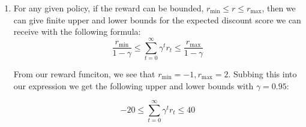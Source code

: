 \documentclass[11pt]{article}
\begin{document}
\begin{enumerate}[label=\alph*)]
    \[
        \vec{U^{\pi}} = (I - \gamma T^{\pi})^{-1}\vec{R^{\pi}}
    \]

    Where $I$ is the $s\times s$ identity matrix, $T^{\pi}$ is the transition probabilities using the given policy at a state $s$. Solving for
    $U^{\pi}(s)$, letting $p = 0.5$ for a fair dice:
    \[
        \vec{U^{\pi}} = \Big(
            \begin{bmatrix}
                1 & 0 & 0 \\
                0 & 1 & 0 \\
                0 & 0 & 1
            \end{bmatrix} - 0.95
            \begin{bmatrix}
                0 & 0.5 & 0.5 \\
                1 & 0 & 0 \\
                1 & 0 & 0
            \end{bmatrix}\Big)^{-1}
            \begin{bmatrix}
                0 \\ 2 \\ -1
            \end{bmatrix}         
    \] 

    \[
        = \begin{bmatrix}
        1 & -0.475 & -0.475 \\
        -0.95 & 1 & 0 \\
        -0.95 & 0 & 1
        \end{bmatrix} ^ {-1}    
        \begin{bmatrix}
            0 \\ 2 \\ -1
        \end{bmatrix} 
    \]

    \[  
    \boxed{ \vec{U^{\pi}} =  
    \begin{bmatrix}
        4.8718 \\ 6.6282 \\ 3.6282
    \end{bmatrix}  }
    \]

    \item
        For any given policy, if the reward can be bounded, $r_{\min} \leq r \leq r_{\max}$, then we can give finite upper and lower bounds 
        for the expected discount score we can receive with the following formula:
        \[
        \frac{r_{\min}}{1-\gamma} \leq \sum^\infty_{t=0} \gamma^t r_t \leq \frac{r_{\max}}{1-\gamma}
        \]

        From our reward funciton, we see that $r_{\min} = -1, r_{\max} = 2$. Subbing this into our expression we get the
        following upper and lower bounds with $\gamma = 0.95$:

        \[
        \boxed{
            -20 \leq \sum^\infty_{t=0} \gamma^t r_t \leq 40
        }
        \]
\end{enumerate}
\end{document}
